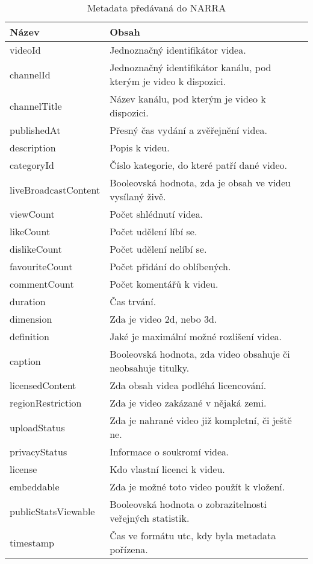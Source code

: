 \begin{table}[!ht]
\centering
\caption[Metadata předávaná do NARRA]{Metadata předávaná do NARRA}\label{tab:bson}
\begin{tabular}{| p{} | p{} |}
\hline
	Název & Obsah \\
\hline
\hline
	videoId & Jednoznačný identifikátor videa. \\
\hline
	channelId & Jednoznačný identifikátor kanálu, pod kterým je video k dispozici. \\
\hline
	channelTitle & Název kanálu, pod kterým je video k dispozici. \\
\hline
	publishedAt & Přesný čas vydání a zvěřejnění videa. \\
\hline
	description & Popis k videu. \\
\hline
	categoryId & Číslo kategorie, do které patří dané video. \\
\hline
	liveBroadcastContent & Booleovská hodnota, zda je obsah ve videu vysílaný živě. \\
\hline
	viewCount & Počet shlédnutí videa. \\
\hline
	likeCount & Počet udělení líbí se. \\
\hline
	dislikeCount & Počet udělení nelíbí se. \\
\hline
	favouriteCount & Počet přidání do oblíbených. \\
\hline
	commentCount & Počet komentářů k videu. \\
\hline
	duration & Čas trvání. \\
\hline
	dimension & Zda je video 2d, nebo 3d. \\
\hline
	definition & Jaké je maximální možné rozlišení videa. \\
\hline
	caption & Booleovská hodnota, zda video obsahuje či neobsahuje titulky. \\
\hline
	licensedContent & Zda obsah videa podléhá licencování. \\
\hline
	regionRestriction & Zda je video zakázané v nějaká zemi. \\
\hline
	uploadStatus & Zda je nahrané video již kompletní, či ještě ne. \\
\hline
	privacyStatus & Informace o soukromí videa. \\
\hline
	license & Kdo vlastní licenci k videu. \\
\hline
	embeddable & Zda je možné toto video použít k vložení. \\
\hline
	publicStatsViewable & Booleovská hodnota o zobrazitelnosti veřejných statistik. \\
\hline
	timestamp & Čas ve formátu utc, kdy byla metadata pořízena. \\
\hline
\end{tabular}
\end{table}

